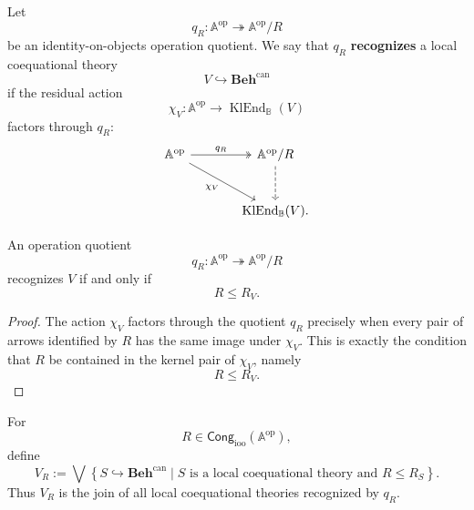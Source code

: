 \begin{definition}
\label{def:recognition-by-operation-quotient}
    Let
    \[
        q_R:\mathbb A^{\mathrm{op}}\twoheadrightarrow
        \mathbb A^{\mathrm{op}}/R
    \]
    be an identity-on-objects operation quotient. We say that \(q_R\)
    \textbf{recognizes} a local coequational theory
    \[
        V\hookrightarrow\mathbf{Beh}^{\mathrm{can}}
    \]
    if the residual action
    \[
        \chi_V:\mathbb A^{\mathrm{op}}\to
        \operatorname{KlEnd}_{\mathbb B}(V)
    \]
    factors through \(q_R\):
    \[
    \begin{tikzcd}[column sep=large, row sep=large]
        \mathbb A^{\mathrm{op}}
            \arrow[r, two heads, "q_R"]
            \arrow[dr, "\chi_V"']
        &
        \mathbb A^{\mathrm{op}}/R
            \arrow[d, dashed]
        \\
        &
        \operatorname{KlEnd}_{\mathbb B}(V).
    \end{tikzcd}
    \]
\end{definition}

\begin{lemma}
\label{lem:operation-quotient-recognition-criterion}
    An operation quotient
    \[
        q_R:\mathbb A^{\mathrm{op}}\twoheadrightarrow
        \mathbb A^{\mathrm{op}}/R
    \]
    recognizes \(V\) if and only if
    \[
        R\leq R_V.
    \]
\end{lemma}

\begin{proof}
    The action \(\chi_V\) factors through the quotient \(q_R\) precisely when
    every pair of arrows identified by \(R\) has the same image under
    \(\chi_V\). This is exactly the condition that \(R\) be contained in the
    kernel pair of \(\chi_V\), namely
    \[
        R\leq R_V.
    \]
\end{proof}

\begin{definition}
\label{def:theory-recognized-by-congruence}
    For
    \[
        R\in\mathsf{Cong}_{\mathrm{ioo}}(\mathbb A^{\mathrm{op}}),
    \]
    define
    \[
        V_R
        :=
        \bigvee
        \left\{
            S\hookrightarrow\mathbf{Beh}^{\mathrm{can}}
            \mid
            S \text{ is a local coequational theory and } R\leq R_S
        \right\}.
    \]
    Thus \(V_R\) is the join of all local coequational theories recognized by
    \(q_R\).
\end{definition}

